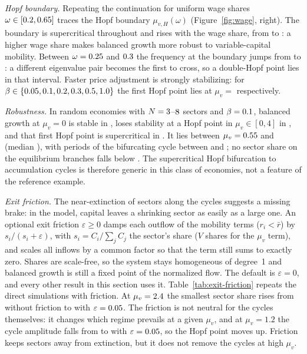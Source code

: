 \documentclass[11pt]{article}
\begin{document}
\emph{Hopf boundary.} Repeating the continuation for uniform wage shares
$\omega\in[0.2,0.65]$ traces the Hopf
boundary $\mu_{v,H}(\omega)$ (Figure~\ref{fig:wage}, right). The boundary
is supercritical throughout and rises with the wage share, from
\AccHopfCurveMuvMin{} to \AccHopfCurveMuvMax: a higher wage share makes
balanced growth more robust to variable-capital mobility. Between
$\omega=0.25$ and $0.3$ the frequency at the
boundary jumps from \AccHopfFreqBefore{} to \AccHopfFreqAfter: a different
eigenvalue pair becomes the first to cross, so a double-Hopf point lies
in that interval. Faster price adjustment is strongly stabilizing: for
$\beta\in\{0.05, 0.1, 0.2, 0.3, 0.5, 1.0\}$ the first Hopf point lies at $\mu_v=$
\AccBetaMuvHList{} respectively.

\emph{Robustness.} In \AccRobN{} random economies with
$N=3$--$8$ sectors and $\beta=0.1$, balanced
growth at $\mu_v=0$ is stable in \AccRobNStable, loses stability at a Hopf
point in $\mu_v\in[0,4]$ in \AccRobNHopf, and that first Hopf point is
supercritical in \AccRobNSuper. It lies between $\mu_v=0.55$ and
\AccRobMuvHMax{} (median \AccRobMuvHMedian), with periods of the
bifurcating cycle between \AccRobPeriodMin{} and \AccRobPeriodMax; no
sector share on the equilibrium branches falls below \AccRobQuotaMin. The
supercritical Hopf bifurcation to accumulation cycles is therefore
generic in this class of economies, not a feature of the reference
example.

\emph{Exit friction.} The near-extinction of sectors along the cycles
suggests a missing brake: in the model, capital leaves a shrinking sector
as easily as a large one. An optional exit friction $\varepsilon\ge0$
damps each outflow of the mobility terms ($r_i<\bar r$) by
$s_i/(s_i+\varepsilon)$, with $s_i=C_i/\sum_jC_j$ the sector's share
($V$ shares for the $\mu_v$ term), and scales all inflows by a common
factor so that the term still sums to exactly zero. Shares are
scale-free, so the system stays homogeneous of degree~1 and balanced
growth is still a fixed point of the normalized flow. The default is
$\varepsilon=0$, and every other result in this section uses it.
Table~\ref{tab:exit-friction} repeats the direct simulations with
friction. At $\mu_v=2.4$ the smallest sector share rises from
\AccExitShareOff{} without friction to \AccExitShareOn{} with
$\varepsilon=0.05$. The friction is not neutral for the cycles
themselves: it changes which regime prevails at a given $\mu_v$, and at
$\mu_v=1.2$ the cycle amplitude falls from \AccExitAmpOffLow{} to
\AccExitAmpOnLow{} with $\varepsilon=0.05$, so the Hopf point
moves up. Friction keeps sectors away from extinction, but it does not
remove the cycles at high $\mu_v$.
\end{document}
